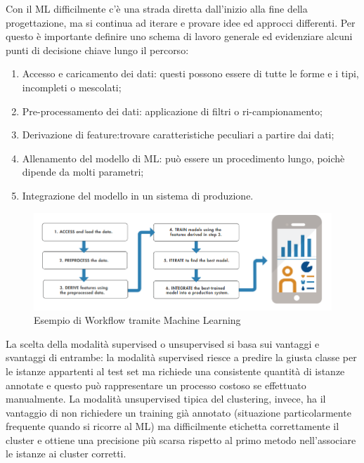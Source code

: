 Con il ML difficilmente c'è una strada diretta dall'inizio alla fine della progettazione, ma si continua ad iterare e provare idee ed approcci differenti. Per questo è importante definire uno schema di lavoro generale ed evidenziare alcuni punti di decisione chiave lungo il percorso:
\begin{enumerate}
	\item Accesso e caricamento dei dati: questi possono essere di tutte le forme e i tipi, incompleti o mescolati;
	\item Pre-processamento dei dati: applicazione di filtri o ri-campionamento;
	\item Derivazione di feature:trovare caratteristiche peculiari a partire dai dati;
	\item Allenamento del modello di ML: può essere un procedimento lungo, poichè dipende da molti parametri;
	\item Integrazione del modello in un sistema di produzione.
\end{enumerate}
\begin{figure}[]
	\centering
	\includegraphics[scale=0.8]{images/Workflow_ML.png}
	\caption{Esempio di Workflow tramite Machine Learning}
\end{figure}
La scelta della modalità supervised o unsupervised si basa sui vantaggi e svantaggi di entrambe: la modalità supervised riesce a predire la giusta classe per le istanze appartenti al test set ma richiede una consistente quantità di istanze annotate e
questo può rappresentare un processo costoso se effettuato manualmente. La modalità unsupervised tipica del clustering, invece, ha il vantaggio di non richiedere un training già annotato (situazione particolarmente frequente quando si
ricorre al ML) ma difficilmente etichetta correttamente il cluster e ottiene una precisione più scarsa rispetto al primo metodo nell'associare le istanze ai cluster corretti. 

